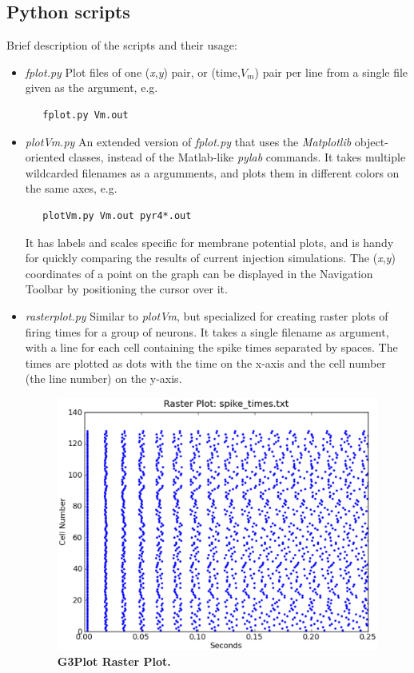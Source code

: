 \documentclass[12pt]{article}
\begin{document}
\subsection*{Python scripts}

Brief description of the scripts and their usage:

\begin{itemize}
\item{\it fplot.py} Plot files of one ({\it x},{\it y}) pair,
or (time,$V_m$) pair per line from a single file given as the argument, e.g.
\begin{verbatim}
   fplot.py Vm.out
\end{verbatim}

\item{\it plotVm.py} An extended version of {\it fplot.py} that uses the {\it Matplotlib}
object-oriented classes, instead of the Matlab-like {\it pylab} commands.  It
takes multiple wildcarded filenames as a argumments, and plots them in
different colors on the same axes, e.g.
\begin{verbatim}
   plotVm.py Vm.out pyr4*.out
\end{verbatim}

It has labels and scales specific for membrane potential plots, and is
handy for quickly comparing the results of current injection simulations.
The ({\it x},{\it y}) coordinates of a point on the graph can be displayed in the
Navigation Toolbar by positioning the cursor over it.

\item{\it rasterplot.py} Similar to {\it plotVm}, but specialized for creating raster
plots of firing times for a group of neurons.  It takes a single filename
as argument, with a line for each cell containing the spike times separated
by spaces.  The times are plotted as dots with the time on the x-axis and
the cell number (the line number) on the y-axis.

\begin{figure}[h]
  \centering
   \includegraphics[scale=0.5]{figures/rasterplot.eps}
\caption{\bf G3Plot Raster Plot.}
  \label{fig:g3p-1}
\end{figure}


\end{itemize}
\end{document}
